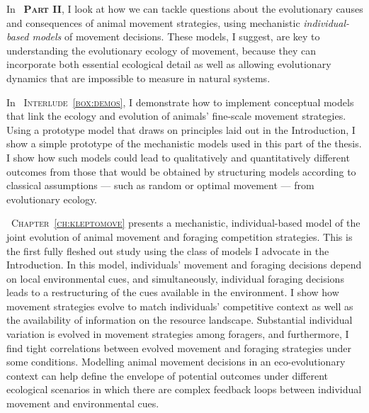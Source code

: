 
\medskip

\noindent In {\scshape~\textbf{Part II}}, I look at how we can tackle questions about the evolutionary causes and consequences of animal movement strategies, using mechanistic \textit{individual-based models} of movement decisions.
These models, I suggest, are key to understanding the evolutionary ecology of movement, because they can incorporate both essential ecological detail as well as allowing evolutionary dynamics that are impossible to measure in natural systems.

\medskip

In {\scshape~Interlude~\ref{box:demos}}, I demonstrate how to implement conceptual models that link the ecology and evolution of animals' fine-scale movement strategies.
Using a prototype model that draws on principles laid out in the Introduction, I show a simple prototype of the mechanistic models used in this part of the thesis.
I show how such models could lead to qualitatively and quantitatively different outcomes from those that would be obtained by structuring models according to classical assumptions --- such as random or optimal movement --- from evolutionary ecology.

\medskip

{\scshape~Chapter~\ref{ch:kleptomove}} presents a mechanistic, individual-based model of the joint evolution of animal movement and foraging competition strategies.
This is the first fully fleshed out study using the class of models I advocate in the {Introduction}.
In this model, individuals' movement and foraging decisions depend on local environmental cues, and simultaneously, individual foraging decisions leads to a restructuring of the cues available in the environment.
I show how movement strategies evolve to match individuals' competitive context as well as the availability of information on the resource landscape.
Substantial individual variation is evolved in movement strategies among foragers, and furthermore, I find tight correlations between evolved movement and foraging strategies under some conditions.
Modelling animal movement decisions in an eco-evolutionary context can help define the envelope of potential outcomes under different ecological scenarios in which there are complex feedback loops between individual movement and environmental cues.

